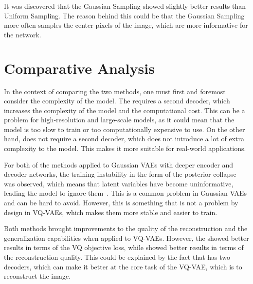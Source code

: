 It was discovered that the Gaussian Sampling showed slightly better results than Uniform Sampling. The reason behind this could be that the Gaussian Sampling more often samples the center pixels of the image, which are more informative for the network.

\section{Comparative Analysis}

In the context of comparing the two methods, one must first and foremost consider the complexity of the model. The  requires a second decoder,
which increases the complexity of the model and the computational cost. This can be a problem for high-resolution and large-scale models, as it could mean that the model is too slow to train or too computationally expensive to use. On the other hand,  does not require a second decoder, which does not introduce a lot of extra complexity to the model. This makes it more suitable for real-world applications.

For both of the methods applied to Gaussian VAEs with deeper encoder and decoder networks, the training instability in the form of the posterior collapse was observed, which means that latent variables have become uninformative, leading the model to ignore them~\cite{lucas2019dont}. This is a common problem in Gaussian VAEs and can be hard to avoid. However, this is something that is not a problem by design in VQ-VAEs, which makes them more stable and easier to train.

Both methods brought improvements to the quality of the reconstruction and the generalization capabilities when applied to VQ-VAEs. However, the  showed better results in terms of the VQ objective loss, while  showed better results in terms of the reconstruction quality. This could be explained by the fact that  has two decoders, which can make it better at the core task of the VQ-VAE, which is to reconstruct the image.



